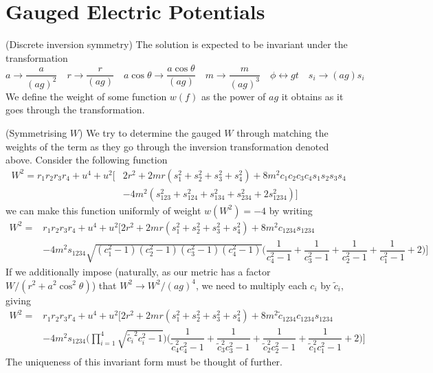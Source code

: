 \section{Gauged Electric Potentials}
\begin{defi}
(Discrete inversion symmetry) The solution is expected to be invariant under the transformation
\[a\rightarrow \dfrac{a}{(ag)^2}\quad r\rightarrow \dfrac{r}{(ag)}\quad a\cos \theta \rightarrow \dfrac{a\cos \theta }{(ag)}\quad m\rightarrow \dfrac{m}{(ag)^3}\quad \phi \leftrightarrow gt\quad  s_{i}\rightarrow (ag)s_{i}\]
We define the weight of some function $w(f)$ as the power of $ag$ it obtains as it goes through the transformation.
\end{defi}
\vspace{2ex}
\begin{lem}
(Symmetrising $W$) We try to determine the gauged $W$ through matching the weights of the term as they go through the inversion transformation denoted above. Consider the following function
\[\begin{align*}
W^2= r_1r_2r_3r_4+u^{4}+u^2\bigg[&2r^2+2mr(s_1^2+s_2^2+s_3^2+s_4^2)
+8m^2c_1c_2c_3c_4s_1s_2s_3s_4\\&-4m^2(s_{123}^2+s_{124}^2+s_{134}^2+s_{234}^2+2s_{1234}^2)\bigg]
\end{align*}\]
we can make this function uniformly of weight $w(W^2)=-4$ by writing
\[\begin{align*}
W^2=&r_1r_2r_3r_4+u^{4}+u^{2}\bigg[2r^2+2mr(s_1^2+s_2^2+s_3^2+s_4^2)+8m^2c_{1234}s_{1234}\\
&-4m^2s_{1234}\sqrt{(c_1^2-1)(c_2^2-1)(c_3^2-1)(c_4^2-1)}\Big(\dfrac{1}{c_4^2-1}+\dfrac{1}{c_3^2-1}+\dfrac{1}{c_2^2-1}+\dfrac{1}{c_1^2-1}+2\Big)\bigg]
\end{align*}\]
If we additionally impose (naturally, as our metric has a factor $W/(r^2+a^2\cos ^2\theta )$) that $W^2\rightarrow W^2/(ag)^4$, we need to multiply each $c_{i}$ by $\tilde{c}_{i}$, giving 
\[\begin{align*}
W^2=&r_1r_2r_3r_4+u^{4}+u^{2}\bigg[2r^2+2mr(s_1^2+s_2^2+s_3^2+s_4^2)+8m^2\tilde{c}_{1234}c_{1234}s_{1234}\\
&-4m^2s_{1234}\Big(\prod_{i=1}^{4}\sqrt{\tilde{c_i}^2c_i^2-1}\Big)\Big(\dfrac{1}{\tilde{c}_{4}^2c_4^2-1}+\dfrac{1}{\tilde{c}_{3}^2c_3^2-1}+\dfrac{1}{\tilde{c}_{2}^2c_2^2-1}+\dfrac{1}{\tilde{c}_{1}^2c_1^2-1}+2\Big)\bigg]
\end{align*}\]
The uniqueness of this invariant form must be thought of further.
\end{lem}
\vspace{2ex}
